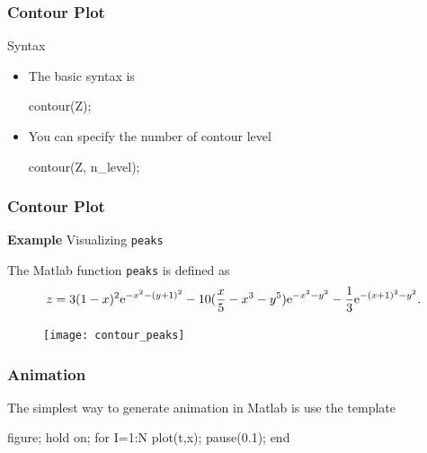\documentclass{beamer}  %
\begin{document}
\begin{frame}[fragile]
\frametitle{Contour Plot}

\begin{block}{Syntax}
\begin{itemize}[<+->]
    \item The basic syntax is
          \begin{matlabcodebeamer}[numbers=none,frame=none]
          contour(Z);
          \end{matlabcodebeamer}
    \item You can specify the number of contour level
          \begin{matlabcodebeamer}[numbers=none,frame=none]
          contour(Z, n_level);
          \end{matlabcodebeamer}
\end{itemize}
\end{block}
\end{frame}
\begin{frame}[fragile]
\frametitle{Contour Plot}
\textbf{Example} Visualizing \texttt{peaks}

The Matlab function \texttt{peaks} is defined as
\begin{equation}
    z = 3(1-x)^2 \textrm{e}^{-x^2 - (y+1)^2} - 10(\frac{x}{5}-x^3-y^5)\textrm{e}^{-x^2-y^2}-
    \frac{1}{3}\textrm{e}^{-(x+1)^2-y^2}.
\end{equation}\pause

\setcounter{subfigure}{0}
\begin{figure}
    \centering
   \texttt{[image: contour\_peaks]}
\end{figure}

\end{frame}
\begin{frame}[fragile]
\frametitle{Animation}
The simplest way to generate animation in Matlab is use the template
\begin{matlabcode}[numbers=none,frame=none]
          figure;
          hold on;    
          for I=1:N
              plot(t,x);  %
              pause(0.1); %
          end
\end{matlabcode}

\end{frame}
\end{document}
